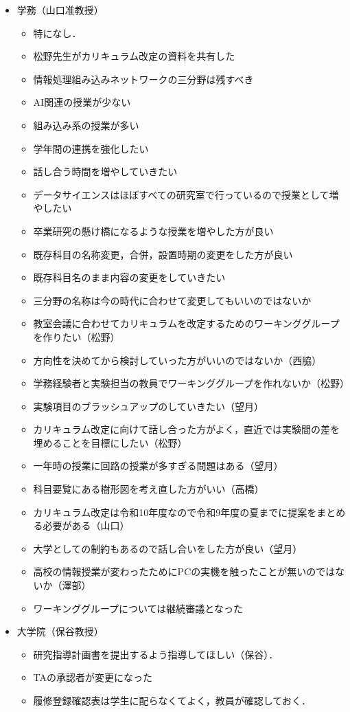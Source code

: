 \documentclass[10.5pt,a4paper]{jsarticle}
\begin{document}
\begin{enumerate}[label=\arabic*：, leftmargin=2zw, labelsep=1zw, itemsep=1\baselineskip]
\begin{itemize}[label=・, leftmargin=1.5zw, itemsep=1\baselineskip]
		\item 学務（山口准教授）
		\begin{itemize}[label=-, leftmargin=2zw, nosep]
			\item 特になし．
			\item 松野先生がカリキュラム改定の資料を共有した
			\item 情報処理組み込みネットワークの三分野は残すべき
			\item AI関連の授業が少ない
			\item 組み込み系の授業が多い
			\item 学年間の連携を強化したい
			\item 話し合う時間を増やしていきたい
			\item データサイエンスはほぼすべての研究室で行っているので授業として増やしたい
			\item 卒業研究の懸け橋になるような授業を増やした方が良い
			\item 既存科目の名称変更，合併，設置時期の変更をした方が良い
			\item 既存科目名のまま内容の変更をしていきたい
			\item 三分野の名称は今の時代に合わせて変更してもいいのではないか
			\item 教室会議に合わせてカリキュラムを改定するためのワーキンググループを作りたい（松野）
			\item 方向性を決めてから検討していった方がいいのではないか（西脇）
			\item 学務経験者と実験担当の教員でワーキンググループを作れないか（松野）
			\item 実験項目のブラッシュアップのしていきたい（望月）
			\item カリキュラム改定に向けて話し合った方がよく，直近では実験間の差を埋めることを目標にしたい（松野）
			\item 一年時の授業に回路の授業が多すぎる問題はある（望月）
			\item 科目要覧にある樹形図を考え直した方がいい（高橋）
			\item カリキュラム改定は令和10年度なので令和9年度の夏までに提案をまとめる必要がある（山口）
			\item 大学としての制約もあるので話し合いをした方が良い（望月）
			\item 高校の情報授業が変わったためにPCの実機を触ったことが無いのではないか（澤部）
			\item ワーキンググループについては継続審議となった
		\end{itemize}
		
		\item 大学院（保谷教授）
		\begin{itemize}[label=-, leftmargin=2zw, nosep]
			\item 研究指導計画書を提出するよう指導してほしい（保谷）．
			\item TAの承認者が変更になった
			\item 履修登録確認表は学生に配らなくてよく，教員が確認しておく．


\end{itemize}
\end{itemize}
\end{enumerate}
\end{document}
